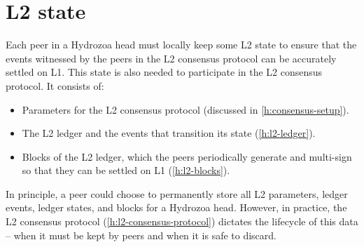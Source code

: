 \documentclass[../hydrozoa.tex]{subfiles}
\begin{document}
\chapter{L2 state}%
\label{h:l2-state}

Each peer in a Hydrozoa head must locally keep some L2 state to ensure that the events witnessed by the peers in the L2 consensus protocol can be accurately settled on L1.
This state is also needed to participate in the L2 consensus protocol.
It consists of:
\begin{itemize}
  \item Parameters for the L2 consensus protocol (discussed in \cref{h:consensus-setup}).
  \item The L2 ledger and the events that transition its state (\cref{h:l2-ledger}).
  \item Blocks of the L2 ledger, which the peers periodically generate and multi-sign so that they can be settled on L1 (\cref{h:l2-blocks}).
\end{itemize}

In principle, a peer could choose to permanently store all L2 parameters, ledger events, ledger states, and blocks for a Hydrozoa head.
However, in practice, the L2 consensus protocol (\cref{h:l2-consensus-protocol}) dictates the lifecycle of this data -- when it must be kept by peers and when it is safe to discard.
\end{document}
